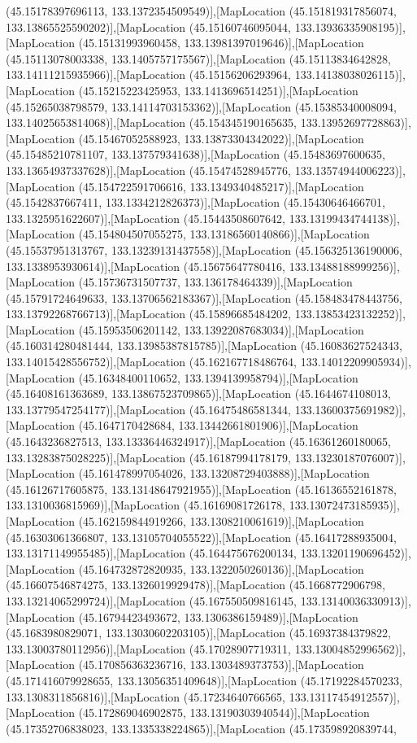 (45.15178397696113, 133.1372354509549)],[MapLocation (45.151819317856074, 133.13865525590202)],[MapLocation (45.15160746095044, 133.13936335908195)],[MapLocation (45.15131993960458, 133.13981397019646)],[MapLocation (45.15113078003338, 133.1405757175567)],[MapLocation (45.15113834642828, 133.14111215935966)],[MapLocation (45.15156206293964, 133.14138038026115)],[MapLocation (45.15215223425953, 133.1413696514251)],[MapLocation (45.15265038798579, 133.14114703153362)],[MapLocation (45.15385340008094, 133.14025653814068)],[MapLocation (45.154345190165635, 133.13952697728863)],[MapLocation (45.15467052588923, 133.13873304342022)],[MapLocation (45.15485210781107, 133.137579341638)],[MapLocation (45.15483697600635, 133.13654937337628)],[MapLocation (45.15474528945776, 133.13574944006223)],[MapLocation (45.154722591706616, 133.1349340485217)],[MapLocation (45.1542837667411, 133.1334212826373)],[MapLocation (45.15430646466701, 133.1325951622607)],[MapLocation (45.15443508607642, 133.13199434744138)],[MapLocation (45.154804507055275, 133.13186560140866)],[MapLocation (45.15537951313767, 133.13239131437558)],[MapLocation (45.156325136190006, 133.1338953930614)],[MapLocation (45.15675647780416, 133.13488188999256)],[MapLocation (45.15736731507737, 133.136178464339)],[MapLocation (45.15791724649633, 133.13706562183367)],[MapLocation (45.158483478443756, 133.13792268766713)],[MapLocation (45.15896685484202, 133.13853423132252)],[MapLocation (45.15953506201142, 133.13922087683034)],[MapLocation (45.160314280481444, 133.13985387815785)],[MapLocation (45.16083627524343, 133.14015428556752)],[MapLocation (45.162167718486764, 133.14012209905934)],[MapLocation (45.16348400110652, 133.1394139958794)],[MapLocation (45.16408161363689, 133.13867523709865)],[MapLocation (45.1644674108013, 133.13779547254177)],[MapLocation (45.16475486581344, 133.13600375691982)],[MapLocation (45.1647170428684, 133.13442661801906)],[MapLocation (45.1643236827513, 133.13336446324917)],[MapLocation (45.16361260180065, 133.13283875028225)],[MapLocation (45.16187994178179, 133.13230187076007)],[MapLocation (45.161478997054026, 133.13208729403888)],[MapLocation (45.16126717605875, 133.13148647921955)],[MapLocation (45.16136552161878, 133.1310036815969)],[MapLocation (45.16169081726178, 133.13072473185935)],[MapLocation (45.162159844919266, 133.1308210061619)],[MapLocation (45.16303061366807, 133.13105704055522)],[MapLocation (45.16417288935004, 133.13171149955485)],[MapLocation (45.164475676200134, 133.13201190696452)],[MapLocation (45.164732872820935, 133.1322050260136)],[MapLocation (45.16607546874275, 133.1326019929478)],[MapLocation (45.1668772906798, 133.13214065299724)],[MapLocation (45.167550509816145, 133.13140036330913)],[MapLocation (45.16794423493672, 133.1306386159489)],[MapLocation (45.1683980829071, 133.13030602203105)],[MapLocation (45.16937384379822, 133.13003780112956)],[MapLocation (45.17028907719311, 133.13004852996562)],[MapLocation (45.170856363236716, 133.1303489373753)],[MapLocation (45.171416079928655, 133.13056351409648)],[MapLocation (45.17192284570233, 133.1308311856816)],[MapLocation (45.17234640766565, 133.13117454912557)],[MapLocation (45.172869046902875, 133.13190303940544)],[MapLocation (45.17352706838023, 133.1335338224865)],[MapLocation (45.173598920839744, 
